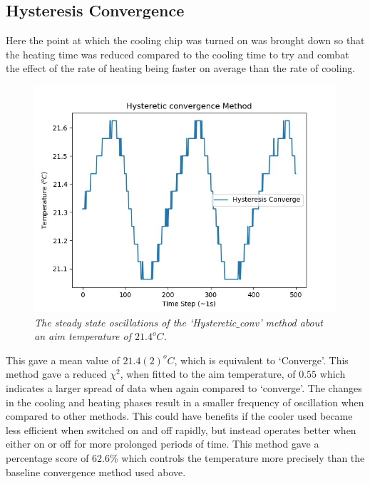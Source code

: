 \documentclass[10pt]{article}
\begin{document}
\subsection*{Hysteresis Convergence}
Here the point at which the cooling chip was turned on was brought down so that the heating time was reduced compared to the cooling time to try and combat the effect of the rate of heating being faster on average than the rate of cooling.\\ 

\begin{figure}[h!]
    \centering
    \includegraphics[scale=0.75]{hyst_conv.jpg}
    \caption{\it{The steady state oscillations of the `Hysteretic$\_$conv' method about an aim temperature of $21.4^oC$.}}
    \label{fig:hyst}
\end{figure}

This gave a mean value of $21.4(2)^oC$, which is equivalent to `Converge'. This method gave a reduced $\chi^2$, when fitted to the aim temperature, of $0.55$ which indicates a larger spread of data when again compared to `converge'. The changes in the cooling and heating phases result in a smaller frequency of oscillation when compared to other methods. This could have benefits if the cooler used became less efficient when switched on and off rapidly, but instead operates better when either on or off for more prolonged periods of time. This method gave a percentage score of $62.6\%$ which controls the temperature more precisely than the baseline convergence method used above.\\
\end{document}
